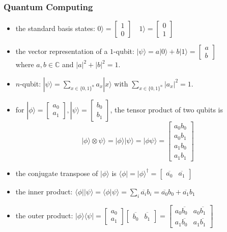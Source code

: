 \documentclass[UTF8,11pt,colorlinks,compress,openany]{beamer}%
\begin{document}
\begin{frame}\frametitle{Quantum Computing}
\setlength\abovedisplayskip{0pt}
\setlength\belowdisplayskip{0pt}
	\begin{itemize}
		\item the standard basis states: $0\rangle=
		\begin{bmatrix}
			1\\
			0
		\end{bmatrix}\quad 1\rangle=
		\begin{bmatrix}
			0\\
			1
		\end{bmatrix}$
		\item the vector representation of a $1$-qubit: $|\psi\rangle = a|0\rangle +b|1\rangle = \begin{bmatrix}a\\b\end{bmatrix}$\\
		where $a,b\in\mathbb{C}$ and $|a|^2+|b|^2=1$.
		\item $n$-qubit: $|\psi\rangle = \sum\limits_{x\in\{0,1\}^n}a_x|x\rangle$ with $\sum\limits_{x\in\{0,1\}^n}|a_x|^2=1$.
		\item for $|\phi\rangle = \begin{bmatrix}a_0\\a_1\end{bmatrix}, |\psi\rangle = \begin{bmatrix}b_0\\b_1\end{bmatrix}$, the tensor product of two qubits is
		\[|\phi\rangle\otimes \psi\rangle=|\phi\rangle|\psi\rangle=|\phi\psi\rangle=\begin{bmatrix}
			a_0b_0\\
			a_0b_1\\
			a_1b_0\\
			a_1b_1
		\end{bmatrix}\]
		\item the conjugate transpose of $|\phi\rangle$ is $\langle \phi|=|\phi\rangle^\dagger=\begin{bmatrix}
			\overline{a_0} &\overline{a_1}
		\end{bmatrix}$
		\item the inner product: $\langle \phi||\psi\rangle=\langle \phi|\psi\rangle=\sum_i\overline{a_i}b_i=\overline{a_0}b_0+\overline{a_1}b_1$
		\item the outer product: $|\phi\rangle\langle \psi|=
		\begin{bmatrix}
			a_0\\
			a_1
		\end{bmatrix}
		\begin{bmatrix}
			\overline{b_0} &\overline{b_1}
		\end{bmatrix}=
		\begin{bmatrix}
			a_0\overline{b_0} &a_0\overline{b_1}\\
			a_1\overline{b_0} &a_1\overline{b_1}
		\end{bmatrix}$
	\end{itemize}
\end{frame}
\end{document}
